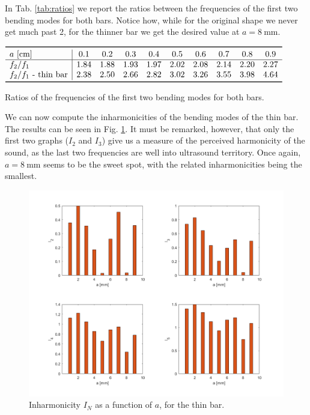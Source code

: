 \documentclass[a4paper]{article}
\begin{document}
In Tab. \ref{tab:ratios} we report the ratios between the frequencies of the first two bending modes for both bars. Notice how, while for the original shape we never get much past 2, for the thinner bar we get the desired value at $a=8~\si{\milli\meter}$. 

\begin{table}[h]
	\centering
	$\begin{array}{l|ccccccccc}
		\toprule
		a~[\si{\centi\meter}] & 0.1 & 0.2 & 0.3 & 0.4 & 0.5 & 0.6 & 0.7 & 0.8 & 0.9\\
		\hline
		f_2/f_1 & 1.84 & 1.88 & 1.93 & 1.97 & 2.02 & 2.08 & 2.14 & 2.20 & 2.27 \\
		f_2/f_1 \text{ - thin bar} & 2.38 & 2.50 & 2.66 & 2.82 & 3.02 & 3.26 & 3.55 & 3.98 & 4.64 \\
		\bottomrule
	\end{array}$
	\caption{Ratios of the frequencies of the first two bending modes for both bars.}
	\label{tab:ratios}
\end{table}

We can now compute the inharmonicities of the bending modes of the thin bar. The results can be seen in Fig. \ref{fig:thinharm}. It must be remarked, however, that only the first two graphs ($I_2$ and $I_3$) give us a measure of the perceived harmonicity of the sound, as the last two frequencies are well into ultrasound territory. Once again, $a=8~\si{\milli\meter}$ seems to be the sweet spot, with the related inharmonicities being the smallest.

\begin{figure}[h]
	\centering
	\includegraphics[width=0.85\linewidth]{thinharm.png}
	\caption{Inharmonicity $I_N$ as a function of $a$, for the thin bar.}
	\label{fig:thinharm}
\end{figure}
\end{document}
